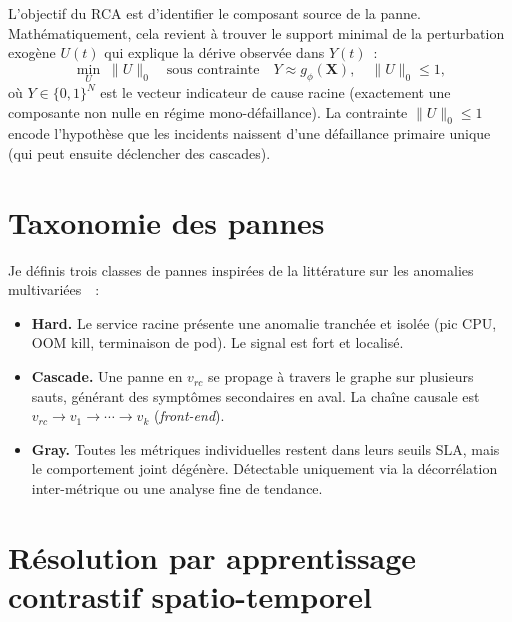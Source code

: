 \documentclass[a4paper,11pt,oneside]{report}
\begin{document}
L'objectif du RCA est d'identifier le composant source de la panne. Math\'ematiquement, cela revient \`a trouver le support minimal de la perturbation exog\`ene $U(t)$ qui explique la d\'erive observ\'ee dans $Y(t)$~:
\begin{equation}
  \min_U \; \lVert U \rVert_0 \quad \text{sous contrainte} \quad Y \approx g_\phi(\mathbf{X}), \quad \lVert U \rVert_0 \le 1,
  \label{eq:rca-inverse}
\end{equation}
o\`u $Y \in \{0,1\}^N$ est le vecteur indicateur de cause racine (exactement une composante non nulle en r\'egime mono-d\'efaillance). La contrainte $\lVert U \rVert_0 \le 1$ encode l'hypoth\`ese que les incidents naissent d'une d\'efaillance primaire unique (qui peut ensuite d\'eclencher des cascades).

\section{Taxonomie des pannes}
\label{sec:taxonomie}

Je d\'efinis trois classes de pannes inspir\'ees de la litt\'erature sur les anomalies multivari\'ees~\cite{chandola2009anomaly}~:
\begin{itemize}
  \item \textbf{Hard.} Le service racine pr\'esente une anomalie tranch\'ee et isol\'ee (pic CPU, OOM kill, terminaison de pod). Le signal est fort et localis\'e.
  \item \textbf{Cascade.} Une panne en $v_{rc}$ se propage \`a travers le graphe sur plusieurs sauts, g\'en\'erant des sympt\^omes secondaires en aval. La cha\^ine causale est $v_{rc} \to v_1 \to \cdots \to v_k$ (\emph{front-end}).
  \item \textbf{Gray.} Toutes les m\'etriques individuelles restent dans leurs seuils SLA, mais le comportement joint d\'eg\'en\`ere. D\'etectable uniquement via la d\'ecorr\'elation inter-m\'etrique ou une analyse fine de tendance.
\end{itemize}

\section{R\'esolution par apprentissage contrastif spatio-temporel}
\label{sec:apprentissage}
\end{document}
